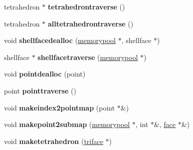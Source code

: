 \begin{DoxyCompactItemize}
\item 
\hypertarget{classtetgenmesh_a11da430cc44475b41fdbfc80de511192}{tetrahedron $\ast$ {\bfseries tetrahedrontraverse} ()}\label{classtetgenmesh_a11da430cc44475b41fdbfc80de511192}

\item 
\hypertarget{classtetgenmesh_afacb84170cf526490d58e2e5a633d6e8}{tetrahedron $\ast$ {\bfseries alltetrahedrontraverse} ()}\label{classtetgenmesh_afacb84170cf526490d58e2e5a633d6e8}

\item 
\hypertarget{classtetgenmesh_ab368f639981dcf465b5e8654942bcc69}{void {\bfseries shellfacedealloc} (\hyperlink{classtetgenmesh_1_1memorypool}{memorypool} $\ast$, shellface $\ast$)}\label{classtetgenmesh_ab368f639981dcf465b5e8654942bcc69}

\item 
\hypertarget{classtetgenmesh_ae50ecae1d69935b12a4fa7ca843011d7}{shellface $\ast$ {\bfseries shellfacetraverse} (\hyperlink{classtetgenmesh_1_1memorypool}{memorypool} $\ast$)}\label{classtetgenmesh_ae50ecae1d69935b12a4fa7ca843011d7}

\item 
\hypertarget{classtetgenmesh_abafc92933f5d33791abeca5eb0a7cc05}{void {\bfseries pointdealloc} (point)}\label{classtetgenmesh_abafc92933f5d33791abeca5eb0a7cc05}

\item 
\hypertarget{classtetgenmesh_a2b088cf9fa743d47b4520d43d9964087}{point {\bfseries pointtraverse} ()}\label{classtetgenmesh_a2b088cf9fa743d47b4520d43d9964087}

\item 
\hypertarget{classtetgenmesh_a0a278dbd160df620cfe93fd3eed5e9da}{void {\bfseries makeindex2pointmap} (point $\ast$\&)}\label{classtetgenmesh_a0a278dbd160df620cfe93fd3eed5e9da}

\item 
\hypertarget{classtetgenmesh_a20c595345b290a1d08c29e4d3a0e0500}{void {\bfseries makepoint2submap} (\hyperlink{classtetgenmesh_1_1memorypool}{memorypool} $\ast$, int $\ast$\&, \hyperlink{classtetgenmesh_1_1face}{face} $\ast$\&)}\label{classtetgenmesh_a20c595345b290a1d08c29e4d3a0e0500}

\item 
\hypertarget{classtetgenmesh_aa1a1561e6fde22070832ae038976067b}{void {\bfseries maketetrahedron} (\hyperlink{classtetgenmesh_1_1triface}{triface} $\ast$)}\label{classtetgenmesh_aa1a1561e6fde22070832ae038976067b}


\end{DoxyCompactItemize}
